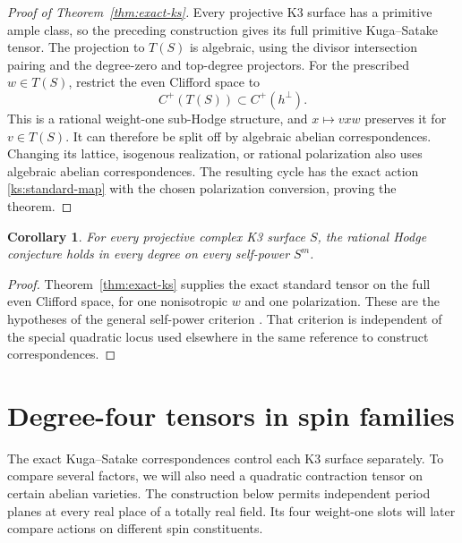 \documentclass[11pt]{article}
\numberwithin{equation}{section}
\newtheorem{corollary}[theorem]{Corollary}
\theoremstyle{definition}
\theoremstyle{remark}
\begin{document}
\begin{proof}[Proof of Theorem~\ref{thm:exact-ks}]
Every projective K3 surface has a primitive ample class,
so the preceding construction gives its full primitive
Kuga--Satake tensor.  The projection to $T(S)$ is algebraic,
using the divisor intersection pairing and the degree-zero
and top-degree projectors.  For the prescribed
$w\in T(S)$, restrict the even Clifford space to
\[
 C^+(T(S))\subset C^+(h^\perp).
\]
This is a rational weight-one sub-Hodge structure, and
$x\mapsto vxw$ preserves it for $v\in T(S)$.  It can
therefore be split off by algebraic abelian
correspondences.  Changing its lattice, isogenous
realization, or rational polarization also uses algebraic
abelian correspondences.  The resulting cycle has the
exact action \eqref{ks:standard-map} with the chosen
polarization conversion, proving the theorem.
\end{proof}

\begin{corollary}
 \label{cor:self-powers}
For every projective complex K3 surface $S$, the rational
Hodge conjecture holds in every degree on every self-power
$S^m$.
\end{corollary}

\begin{proof}
Theorem~\ref{thm:exact-ks} supplies the exact standard
tensor on the full even Clifford space, for one
nonisotropic $w$ and one polarization.  These are the
hypotheses of the general self-power criterion
\cite[Theorem~1.1]{AKS}.  That criterion is independent
of the special quadratic locus used elsewhere in the
same reference to construct correspondences.
\end{proof}

\section{Degree-four tensors in spin families}
\label{sec:auxiliary}

The exact Kuga--Satake correspondences control each K3
surface separately.  To compare several factors, we will
also need a quadratic contraction tensor on certain
abelian varieties.  The construction below permits
independent period planes at every real place of a
totally real field.  Its four weight-one slots will
later compare actions on different spin constituents.
\end{document}
